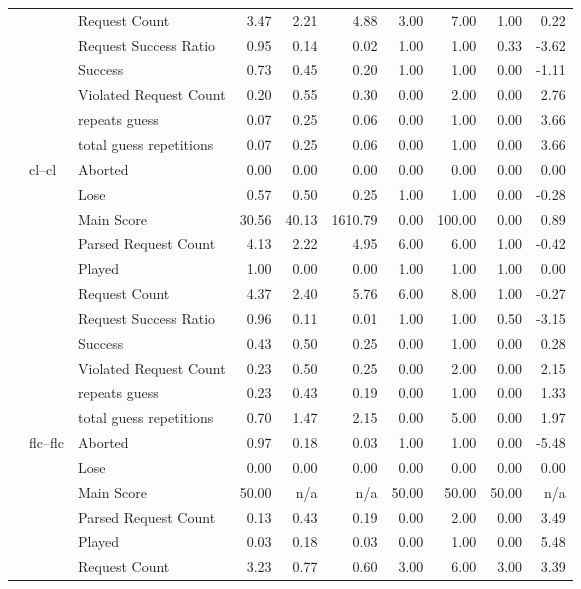 \begin{tabular}{lllrrrrrrr}
 &  & Request Count & 3.47 & 2.21 & 4.88 & 3.00 & 7.00 & 1.00 & 0.22 \\
 &  & Request Success Ratio & 0.95 & 0.14 & 0.02 & 1.00 & 1.00 & 0.33 & -3.62 \\
 &  & Success & 0.73 & 0.45 & 0.20 & 1.00 & 1.00 & 0.00 & -1.11 \\
 &  & Violated Request Count & 0.20 & 0.55 & 0.30 & 0.00 & 2.00 & 0.00 & 2.76 \\
 &  & repeats guess & 0.07 & 0.25 & 0.06 & 0.00 & 1.00 & 0.00 & 3.66 \\
 &  & total guess repetitions & 0.07 & 0.25 & 0.06 & 0.00 & 1.00 & 0.00 & 3.66 \\
\cline{2-10}
 & \multirow[t]{11}{*}{cl--cl} & Aborted & 0.00 & 0.00 & 0.00 & 0.00 & 0.00 & 0.00 & 0.00 \\
 &  & Lose & 0.57 & 0.50 & 0.25 & 1.00 & 1.00 & 0.00 & -0.28 \\
 &  & Main Score & 30.56 & 40.13 & 1610.79 & 0.00 & 100.00 & 0.00 & 0.89 \\
 &  & Parsed Request Count & 4.13 & 2.22 & 4.95 & 6.00 & 6.00 & 1.00 & -0.42 \\
 &  & Played & 1.00 & 0.00 & 0.00 & 1.00 & 1.00 & 1.00 & 0.00 \\
 &  & Request Count & 4.37 & 2.40 & 5.76 & 6.00 & 8.00 & 1.00 & -0.27 \\
 &  & Request Success Ratio & 0.96 & 0.11 & 0.01 & 1.00 & 1.00 & 0.50 & -3.15 \\
 &  & Success & 0.43 & 0.50 & 0.25 & 0.00 & 1.00 & 0.00 & 0.28 \\
 &  & Violated Request Count & 0.23 & 0.50 & 0.25 & 0.00 & 2.00 & 0.00 & 2.15 \\
 &  & repeats guess & 0.23 & 0.43 & 0.19 & 0.00 & 1.00 & 0.00 & 1.33 \\
 &  & total guess repetitions & 0.70 & 1.47 & 2.15 & 0.00 & 5.00 & 0.00 & 1.97 \\
\cline{2-10}
 & \multirow[t]{11}{*}{flc--flc} & Aborted & 0.97 & 0.18 & 0.03 & 1.00 & 1.00 & 0.00 & -5.48 \\
 &  & Lose & 0.00 & 0.00 & 0.00 & 0.00 & 0.00 & 0.00 & 0.00 \\
 &  & Main Score & 50.00 & n/a & n/a & 50.00 & 50.00 & 50.00 & n/a \\
 &  & Parsed Request Count & 0.13 & 0.43 & 0.19 & 0.00 & 2.00 & 0.00 & 3.49 \\
 &  & Played & 0.03 & 0.18 & 0.03 & 0.00 & 1.00 & 0.00 & 5.48 \\
 &  & Request Count & 3.23 & 0.77 & 0.60 & 3.00 & 6.00 & 3.00 & 3.39 \\

\end{tabular}

